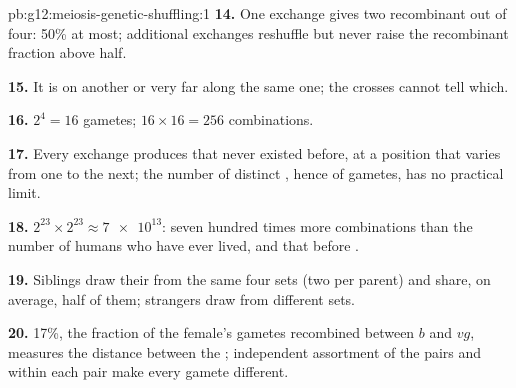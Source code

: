 \begin{solution}{pb:g12:meiosis-genetic-shuffling:1}
\textbf{14.} One exchange gives two recombinant  out of four:
50\% at most; additional exchanges reshuffle but never raise the
recombinant fraction above half.

\textbf{15.} It is on another  or very far along the same
one; the crosses cannot tell which.

\textbf{16.} $2^4 = 16$ gametes; $16 \times 16 = 256$ combinations.

\textbf{17.} Every exchange produces  that never existed
before, at a position that varies from one  to the next; the
number of distinct , hence of gametes, has no practical
limit.

\textbf{18.} $2^{23} \times 2^{23} \approx \num{7e13}$: seven hundred
times more combinations than the number of humans who have ever lived,
and that before .

\textbf{19.} Siblings draw their  from the same four sets
(two per parent) and share, on average, half of them; strangers draw
from different sets.

\textbf{20.} 17\%, the fraction of the female's gametes recombined
between $b$ and $vg$, measures the distance between the ;
independent assortment of the pairs and  within each
pair make every gamete different.
\end{solution}
